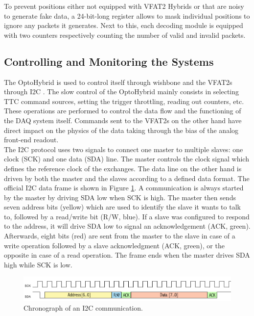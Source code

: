       To prevent positions either not equipped with VFAT2 Hybrids or that are noisy to generate fake data, a 24-bit-long register allows to mask individual positions to ignore any packets it generates. Next to this, each decoding module is equipped with two counters respectively counting the number of valid and invalid packets.

    \subsection{Controlling and Monitoring the Systems}

      The OptoHybrid is used to control itself through wishbone and the VFAT2s through I2C \cite{i2c}. The slow control of the OptoHybrid mainly consists in selecting TTC command sources, setting the trigger throttling, reading out counters, etc. These operations are performed to control the data flow and the functioning of the DAQ system itself. Commands sent to the VFAT2s on the other hand have direct impact on the physics of the data taking through the bias of the analog front-end readout. \\

      The I2C protocol uses two signals to connect one master to multiple slaves: one clock (SCK) and one data (SDA) line. The master controls the clock signal which defines the reference clock of the exchanges. The data line on the other hand is driven by both the master and the slaves according to a defined data format. The official I2C data frame is shown in Figure \ref{fig:II-3-i2c}. A communication is always started by the master by driving SDA low when SCK is high. The master then sends seven address bits (yellow) which are used to identify the slave it wants to talk to, followed by a read/write bit (R/W, blue). If a slave was configured to respond to the address, it will drive SDA low to signal an acknowledgement (ACK, green). Afterwards, eight bits (red) are sent from the master to the slave in case of a write operation followed by a slave acknowledgment (ACK, green), or the opposite in case of a read operation. The frame ends when the master drives SDA high while SCK is low. \\

      \begin{figure}[h!]
        \centering
        \includegraphics[width=\textwidth]{img/II-3-test-beam/i2c.png}
        \caption{Chronograph of an I2C communication.}
        \label{fig:II-3-i2c}
      \end{figure}

